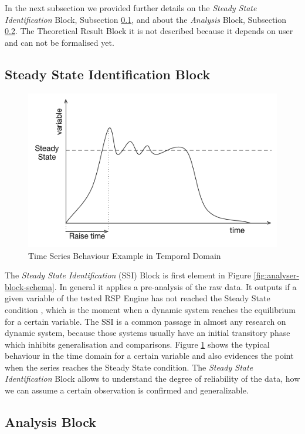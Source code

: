 In the next subsection we provided further details on the \textit{Steady State Identification} Block, Subsection \ref{sec:analyser-ss-block}, and about the \textit{Analysis} Block, Subsection \ref{sec:analyser-analysis-block}. The Theoretical Result Block it is not described because it depends on \name user and can not be formalised yet.

\subsection{Steady State Identification Block}\label{sec:analyser-ss-block}

\begin{figure}[tbh]
  \centering
	\includegraphics[width=0.5\linewidth]{images/steady-state}
	\caption{Time Series Behaviour Example in Temporal Domain} 	
  	\label{fig:steady-state}
\end{figure}

The \textit{Steady State Identification} (SSI) Block is first element in Figure \ref{fig:analyser-block-schema}. In general it applies a pre-analysis of the raw data. It outputs if a given variable of the tested RSP Engine has not reached the Steady State condition , which is the moment when a dynamic system reaches the equilibrium for a certain variable. The SSI is a common passage in almost any research on dynamic system, because those systems usually have an initial transitory phase which inhibits generalisation and comparisons. Figure \ref{fig:steady-state} shows the typical behaviour in the time domain for a certain variable and also evidences the point when the series reaches the Steady State condition. The \textit{Steady State Identification} Block allows to understand the degree of reliability of the data, how we can assume a certain observation is confirmed and generalizable. %


\subsection{Analysis Block}\label{sec:analyser-analysis-block}

